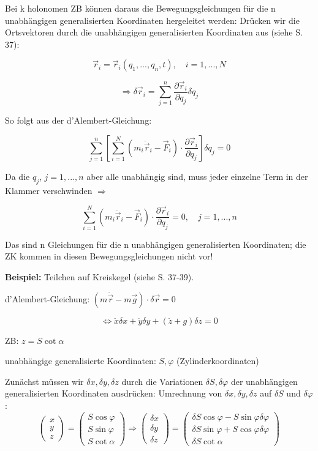 \documentclass[10pt, letterpaper]{article}
\begin{document}
Bei k holonomen ZB können daraus die Bewegungsgleichungen für die n unabhängigen generalisierten Koordinaten hergeleitet werden:
Drücken wir die Ortsvektoren durch die unabhängigen generalisierten Koordinaten aus (siehe S. 37):

\[\vec{r}_i = \vec{r}_i(q_1,...,q_n,t), \quad i=1,...,N\]

\[\Rightarrow \delta\vec{r}_i = \sum_{j=1}^n \frac{\partial\vec{r}_i}{\partial q_j}\delta q_j\]

So folgt aus der d'Alembert-Gleichung:

\[\sum_{j=1}^n \left[\sum_{i=1}^N (m_i\ddot{\vec{r}}_i-\vec{F}_i)\cdot\frac{\partial\vec{r}_i}{\partial q_j}\right]\delta q_j = 0\]

Da die $q_j$, $j=1,...,n$ aber alle unabhängig sind, muss jeder einzelne Term in der Klammer verschwinden $\Rightarrow$

\[\sum_{i=1}^N (m_i\ddot{\vec{r}}_i-\vec{F}_i)\cdot\frac{\partial\vec{r}_i}{\partial q_j} = 0, \quad j=1,...,n\]

Das sind n Gleichungen für die n unabhängigen generalisierten Koordinaten; die ZK kommen in diesen Bewegungsgleichungen nicht vor!



\textbf{Beispiel:} Teilchen auf Kreiskegel (siehe S. 37-39).

d'Alembert-Gleichung: $(m\ddot{\vec{r}}-m\vec{g})\cdot\delta\vec{r}=0$

\[\Leftrightarrow \ddot{x}\delta x + \ddot{y}\delta y + (\ddot{z}+g)\delta z = 0\]

ZB: $z = S\cot\alpha$

unabhängige generalisierte Koordinaten: $S,\varphi$ (Zylinderkoordinaten)

Zunächst müssen wir $\delta x, \delta y, \delta z$ durch die Variationen $\delta S, \delta\varphi$ der unabhängigen generalisierten Koordinaten ausdrücken:
Umrechnung von $\delta x, \delta y, \delta z$ auf $\delta S$ und $\delta \varphi$:
\[\begin{pmatrix} x \\ y \\ z \end{pmatrix} = \begin{pmatrix} S\cos\varphi \\ S\sin\varphi \\ S\cot\alpha \end{pmatrix} \Rightarrow \begin{pmatrix} \delta x \\ \delta y \\ \delta z \end{pmatrix} = \begin{pmatrix} \delta S\cos\varphi - S\sin\varphi\delta\varphi \\ \delta S\sin\varphi + S\cos\varphi\delta\varphi \\ \delta S\cot\alpha \end{pmatrix}\]
\end{document}
